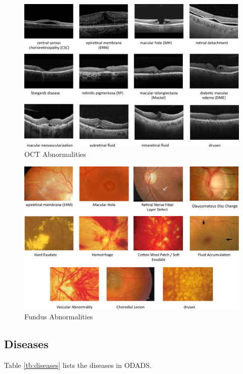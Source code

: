 \documentclass{article}
\begin{document}
	\begin{figure}[htbp]
		\centering
		\includegraphics[width=0.9\linewidth]{OCT-abnormalities.pdf}
		\caption{OCT Abnormalities}
		\vspace{0.3cm}
		\label{fig:oct-abnormalities}
	\end{figure}
	
	\begin{figure}[htbp]
		\centering
		\includegraphics[width=0.9\linewidth]{fundus-ab.pdf}
		\caption{Fundus Abnormalities}
		\vspace{0.3cm}
		\label{fig:fundus-abnormalities}
	\end{figure}
	
	\subsection{Diseases}
		Table \ref{tb:diseases} lists the diseases in ODADS.
	
\end{document}
